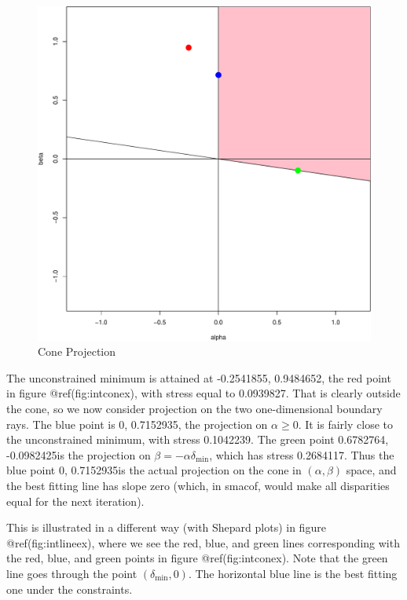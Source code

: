 \documentclass[
  12pt,
  letterpaper,
  DIV=11,
  numbers=noendperiod]{scrreprt}
\theoremstyle{remark}
\begin{document}
\begin{figure}[H]

{\centering \includegraphics{interval_files/figure-pdf/intconex-1.pdf}

}

\caption{Cone Projection}

\end{figure}%

The unconstrained minimum is attained at -0.2541855, 0.9484652, the red
point in figure @ref(fig:intconex), with stress equal to 0.0939827. That
is clearly outside the cone, so we now consider projection on the two
one-dimensional boundary rays. The blue point is 0, 0.7152935, the
projection on \(\alpha\geq 0\). It is fairly close to the unconstrained
minimum, with stress 0.1042239. The green point 0.6782764, -0.0982425is
the projection on \(\beta=-\alpha\delta_{\text{min}}\), which has stress
0.2684117. Thus the blue point 0, 0.7152935is the actual projection on
the cone in \((\alpha,\beta)\) space, and the best fitting line has
slope zero (which, in smacof, would make all disparities equal for the
next iteration).

This is illustrated in a different way (with Shepard plots) in figure
@ref(fig:intlineex), where we see the red, blue, and green lines
corresponding with the red, blue, and green points in figure
@ref(fig:intconex). Note that the green line goes through the point
\((\delta_{\text{min}},0)\). The horizontal blue line is the best
fitting one under the constraints.
\end{document}
